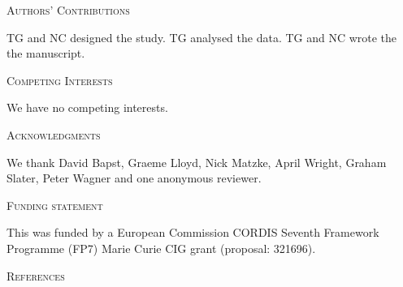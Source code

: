 \documentclass[12pt,letterpaper]{article}
\renewcommand{\section}[1]{%
\bigskip
\begin{center}
\begin{Large}
\normalfont\scshape #1
\medskip
\end{Large}
\end{center}}
\begin{document}
\section{Authors' Contributions}
TG and NC designed the study. TG analysed the data. TG and NC wrote the the manuscript.
\section{Competing Interests}
We have no competing interests.
\section{Acknowledgments}
We thank David Bapst, Graeme Lloyd, Nick Matzke, April Wright, Graham Slater, Peter Wagner and one anonymous reviewer.
\section{Funding statement}
This was funded by a European Commission CORDIS Seventh Framework Programme (FP7) Marie Curie CIG grant (proposal: 321696).

\section{References}





\end{document}
